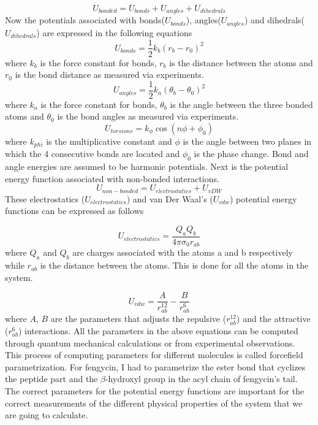 \begin{equation}
\label{eq:total_bonded}
    U_{bonded} = U_{bonds} + U_{angles} + U_{dihedrals}
\end{equation}
Now the potentials associated with bonds($U_{bonds}$), angles($U_{angles}$) and dihedrals($U_{dihedrals}$) are expressed in the following equations
\begin{equation}
\label{eq:pot_bonds}
   U_{bonds}= \frac{1}{2}k_b(r_b-r_0)^2
\end{equation}
where $k_b$ is the force constant for bonds, $r_b$ is the distance between the atoms and $r_0$ is the bond distance as measured via experiments.\cite{Lin2016}
\begin{equation}
\label{eq:pot_angles}
   U_{angles}= \frac{1}{2}k_a(\theta_b-\theta_0)^2
\end{equation}
where $k_a$ is the force constant for bonds, $\theta_b$ is the angle between the three bonded atoms and $\theta_0$ is the bond angles as measured via experiments.\cite{Lin2016}
\begin{equation}
\label{eq:torsions}
    U_{torsions} = k_{\phi}\cos \left( n\phi + \phi_0 \right )
\end{equation}
where $k_{phi}$ is the multiplicative constant and $\phi$ is the angle
between two planes in which the 4 consecutive bonds are located and $\phi_0$ is the phase change.\cite{Lin2016}
 Bond and angle energies are assumed to be
harmonic potentials.
Next is the potential energy function associated with non-bonded interactions.
\begin{equation}
\label{eq:pot_nb}
    U_{non-bonded} = U_{electrostatics} + U_{vDW}
\end{equation}
These electrostatics ($U_{electrostatics}$) and van Der Waal's ($U_{vdw}$) potential energy functions can be 
expressed as follows

\begin{equation}
\label{eq:electrostatics}
    U_{electrostatics}= \frac{Q_a Q_b}{4\pi \sigma_0 r_{ab}}
\end{equation}
where $Q_{a}$ and $Q_b$ are charges associated with the atoms a and b  respectively while $r_{ab}$ is the distance between the atoms. This is done for all the atoms in the system.\cite{Lin2016}

\begin{equation}
\label{eq:vdw}
    U_{vdw} = \frac{A}{r_{ab}^{12}} - \frac{B}{r_{ab}^{6}}
\end{equation}
where $A$, $B$ are the parameters that adjusts the repulsive ($r_{ab}^{12}$)
and the attractive ($r_{ab}^6$) interactions. \cite{Lin2016}
All the parameters in the above equations can be computed through quantum 
mechanical calculations or from experimental observations. This process of 
computing parameters for different molecules is called forcefield 
parametrization.
For fengycin, I had to parametrize the ester bond that cyclizes the peptide part and the $\beta$-hydroxyl group in the acyl chain of fengycin's tail.
The correct parameters for the 
potential energy functions are important for the correct measurements
of the different physical properties of the system that we are going to calculate.\cite{Lin2016}


